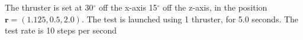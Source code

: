 The thruster is set at 30$^\circ$ off the x-axis 15$^\circ$ off the z-axis, in the position $\bm r = \left(1.125,0.5,2.0\right)$. The test is launched using 1 thruster, for 5.0 seconds. The test rate is 10 steps per second